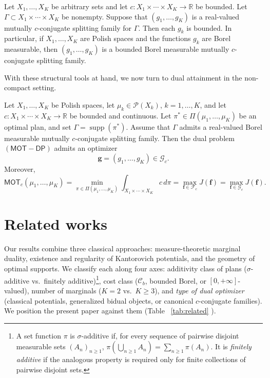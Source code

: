 \documentclass[twoside,11pt,a4paper]{article}
\newcommand*{\SavedRef}{}
\let\SavedRef\ref
\renewcommand*{\ref}[1]{  \begingroup
    \hypersetup{
      linkcolor=linkequation,
      linkbordercolor=linkequation,
    }    \SavedRef{#1}  \endgroup
}
\begin{document}
\begin{proposition}
\label{bounded-splitting}
Let \(X_1,\ldots,X_K\) be arbitrary sets and let
\(
c:X_1\times\cdots\times X_K\to\mathbb R
\)
be bounded. Let
\(\Gamma\subset X_1\times\cdots\times X_K\) be nonempty. Suppose that
\((g_1,\ldots,g_K)\) is a real-valued mutually \(c\)-conjugate splitting family
for \(\Gamma\). Then each \(g_k\) is bounded. In particular, if
\(X_1,\ldots,X_K\) are Polish spaces and the functions \(g_k\) are Borel
measurable, then \((g_1,\ldots,g_K)\) is a bounded Borel measurable mutually
\(c\)-conjugate splitting family.
\end{proposition}

\medskip




With these structural tools at hand, we now turn to dual attainment in the non-compact setting.





\begin{theorem}
\label{noncompact}
Let \(X_1,\ldots,X_K\) be Polish spaces, let
\(\mu_k\in\mathcal P(X_k)\), \(k=1,\ldots,K\), and let $
c:X_1\times\cdots\times X_K\to\mathbb R$
be bounded and continuous. Let $
\pi^*\in\Pi(\mu_1,\ldots,\mu_K)$
be an optimal plan, and set $
\Gamma=\operatorname{supp}(\pi^*)$.
Assume that \(\Gamma\) admits a real-valued Borel measurable mutually
\(c\)-conjugate splitting family. Then the dual problem
\((\mathsf{MOT}\!-\!\mathsf{DP})\) admits an optimizer
\[
\boldsymbol g=(g_1,\ldots,g_K)\in\mathcal G_c .
\]
Moreover,
\[
\mathsf{MOT}_c(\mu_1,\ldots,\mu_K)
=
\min_{\pi\in\Pi(\mu_1,\ldots,\mu_K)}
\int_{X_1\times\cdots\times X_K} c\,d\pi
=
\max_{\boldsymbol f\in\mathcal F_c}J(\boldsymbol f)
=
\max_{\boldsymbol f\in\mathcal G_c}J(\boldsymbol f).
\]
\end{theorem}




\section{Related works}\label{sec:related}

Our results combine three classical approaches: measure-theoretic marginal duality,
existence and regularity of Kantorovich potentials, and the geometry of optimal
supports. We classify each along four axes: additivity class of plans
($\sigma$-additive vs.\ finitely additive)\footnote{A set function $\pi$ is
$\sigma$-additive if, for every sequence of pairwise disjoint measurable sets
$(A_n)_{n\ge1}$, $
\pi\left(\bigcup_{n\ge1}A_n\right)=\sum_{n\ge1}\pi(A_n)$. It is \emph{finitely additive} if the analogous property is required only for
finite collections of pairwise disjoint sets.}, cost class ($\mathcal C_b$, bounded
Borel, or $[0,+\infty]$-valued), number of marginals ($K=2$ vs.\ $K\ge3$), and
\emph{type of dual optimizer} (classical potentials, generalized bidual objects,
or canonical $c$-conjugate families). We position the present paper against
them (Table~\ref{tab:related}).
\end{document}
